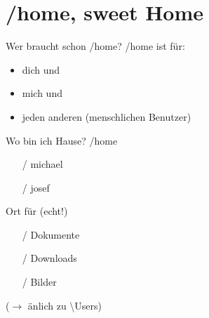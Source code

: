 \section[/home]{/home, sweet Home}
\begin{frame}{Wer braucht schon /home?}
/home ist für:
\begin{itemize}
 \item dich und
 \item mich und
 \item jeden anderen (menschlichen Benutzer)
\end{itemize}
\end{frame}

\begin{frame}{Wo bin ich Hause?}
/home
\begin{itemize}
  \item [/] michael
  \item [/] josef
\end{itemize}
\vfill
Ort für  {\small (echt!)}
\begin{itemize}
 \item [/] Dokumente
 \item [/] Downloads
 \item [/] Bilder
\end{itemize}
\vfill
($\longrightarrow$ änlich zu \textbackslash Users)

\vfill
\end{frame}